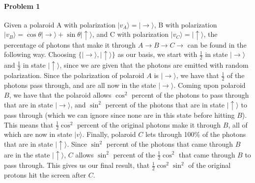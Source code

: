 \documentclass[12pt]{article}
\theoremstyle{mytheor}
\begin{document}
\paragraph{Problem 1}
Given a polaroid A with polarization $|v_A\rangle = |\rightarrow\rangle$, B with polarization $|v_B\rangle = \cos\theta|\rightarrow\rangle + \sin\theta|\uparrow\rangle$, and C with polarization $|v_C\rangle = |\uparrow\rangle$, the percentage of photons that make it through $A \rightarrow B \rightarrow C \rightarrow$ can be found in the following way. Choosing $\{|\rightarrow\rangle, |\uparrow\rangle\}$ as our basis, we start with $\frac{1}{2}$ in state $|\rightarrow\rangle$ and $\frac{1}{2}$ in state $|\uparrow\rangle$, since we are given that the photons are emitted with random polarization. Since the polarization of polaroid $A$ is $|\rightarrow \rangle$, we have that $\frac{1}{2}$ of the photons pass through, and are all now in the state $|\rightarrow \rangle$. Coming upon polaroid $B$, we have that the polaroid allows $\cos^2$ percent of the photons to pass through that are in state $|\rightarrow \rangle$, and $\sin^2$ percent of the photons that are in state $|\uparrow \rangle$ to pass through (which we can ignore since none are in this state before hitting $B$). This means that $\frac{1}{2}\cos^2$ percent of the original photons make it through $B$, all of which are now in state $|v\rangle$. Finally, polaroid $C$ lets through 100\% of the photons that are in state $|\uparrow \rangle$. Since $\sin^2$ percent of the photons that came through $B$ are in the state $|\uparrow \rangle$, $C$ allows $\sin^2$ percent of the $\frac{1}{2}\cos^2$ that came through $B$ to pass through. This gives us our final result, that $\frac{1}{2}\cos^2\sin^2$ of the original protons hit the screen after $C$.
\end{document}
